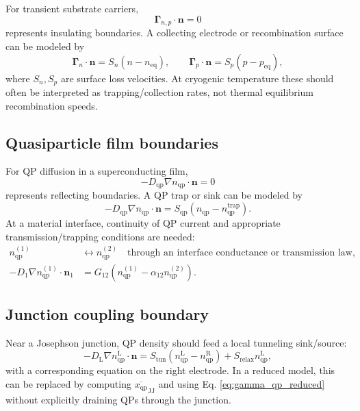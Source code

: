 \documentclass[11pt]{article}
\newcommand{\nvecb}{\bm{n}}
\newcommand{\nqp}{n_{\mathrm{qp}}}
\newcommand{\xqp}{x_{\mathrm{qp}}}
\newcommand{\Dqp}{D_{\mathrm{qp}}}
\begin{document}
For transient substrate carriers,
\begin{equation}
\bm{\Gamma}_{n,p}\cdot\nvecb = 0
\end{equation}
represents insulating boundaries. A collecting electrode or recombination surface can be modeled by
\begin{equation}
\bm{\Gamma}_{n}\cdot\nvecb = S_n(n-n_{\mathrm{eq}}),\qquad
\bm{\Gamma}_{p}\cdot\nvecb = S_p(p-p_{\mathrm{eq}}),
\end{equation}
where \(S_n,S_p\) are surface loss velocities. At cryogenic temperature these should often be interpreted as trapping/collection rates, not thermal equilibrium recombination speeds.

\subsection{Quasiparticle film boundaries}

For QP diffusion in a superconducting film,
\begin{equation}
-\Dqp\nabla\nqp\cdot\nvecb = 0
\end{equation}
represents reflecting boundaries. A QP trap or sink can be modeled by
\begin{equation}
-\Dqp\nabla\nqp\cdot\nvecb = S_{\mathrm{qp}}\left(\nqp-\nqp^{\mathrm{trap}}\right).
\end{equation}
At a material interface, continuity of QP current and appropriate transmission/trapping conditions are needed:
\begin{align}
\nqp^{(1)} &\leftrightarrow \nqp^{(2)} \quad \text{through an interface conductance or transmission law},\\
-D_1\nabla\nqp^{(1)}\cdot\nvecb_1 &= G_{12}\left(\nqp^{(1)}-\alpha_{12}\nqp^{(2)}\right).
\end{align}

\subsection{Junction coupling boundary}

Near a Josephson junction, QP density should feed a local tunneling sink/source:
\begin{equation}
-D_{\mathrm{L}}\nabla\nqp^{\mathrm{L}}\cdot\nvecb = S_{\mathrm{tun}}\left(\nqp^{\mathrm{L}}-\nqp^{\mathrm{R}}\right)+S_{\mathrm{relax}}\nqp^{\mathrm{L}},
\end{equation}
with a corresponding equation on the right electrode. In a reduced model, this can be replaced by computing \(\overline{\xqp}_{\mathrm{JJ}}\) and using Eq. \eqref{eq:gamma_qp_reduced} without explicitly draining QPs through the junction.
\end{document}
